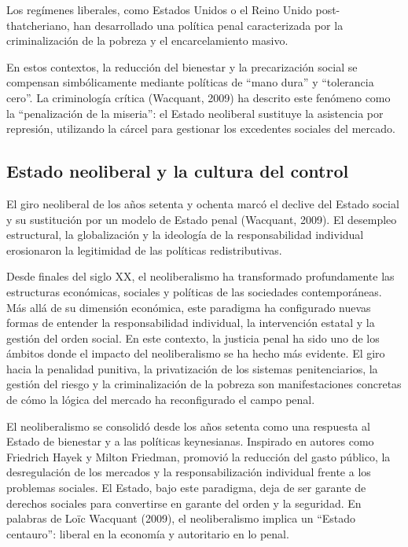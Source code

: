 \documentclass[
  spanish,
  letterpaper,
  DIV=11,
  numbers=noendperiod]{scrreprt}
\begin{document}
Los regímenes liberales, como Estados Unidos o el Reino Unido
post-thatcheriano, han desarrollado una política penal caracterizada por
la criminalización de la pobreza y el encarcelamiento masivo.

En estos contextos, la reducción del bienestar y la precarización social
se compensan simbólicamente mediante políticas de ``mano dura'' y
``tolerancia cero''. La criminología crítica (Wacquant, 2009) ha
descrito este fenómeno como la ``penalización de la miseria'': el Estado
neoliberal sustituye la asistencia por represión, utilizando la cárcel
para gestionar los excedentes sociales del mercado.

\subsection{Estado neoliberal y la cultura del
control}\label{estado-neoliberal-y-la-cultura-del-control}

El giro neoliberal de los años setenta y ochenta marcó el declive del
Estado social y su sustitución por un modelo de Estado penal (Wacquant,
2009). El desempleo estructural, la globalización y la ideología de la
responsabilidad individual erosionaron la legitimidad de las políticas
redistributivas.

Desde finales del siglo XX, el neoliberalismo ha transformado
profundamente las estructuras económicas, sociales y políticas de las
sociedades contemporáneas. Más allá de su dimensión económica, este
paradigma ha configurado nuevas formas de entender la responsabilidad
individual, la intervención estatal y la gestión del orden social. En
este contexto, la justicia penal ha sido uno de los ámbitos donde el
impacto del neoliberalismo se ha hecho más evidente. El giro hacia la
penalidad punitiva, la privatización de los sistemas penitenciarios, la
gestión del riesgo y la criminalización de la pobreza son
manifestaciones concretas de cómo la lógica del mercado ha reconfigurado
el campo penal.

El neoliberalismo se consolidó desde los años setenta como una respuesta
al Estado de bienestar y a las políticas keynesianas. Inspirado en
autores como Friedrich Hayek y Milton Friedman, promovió la reducción
del gasto público, la desregulación de los mercados y la
responsabilización individual frente a los problemas sociales. El
Estado, bajo este paradigma, deja de ser garante de derechos sociales
para convertirse en garante del orden y la seguridad. En palabras de
Loïc Wacquant (2009), el neoliberalismo implica un ``Estado centauro'':
liberal en la economía y autoritario en lo penal.
\end{document}
